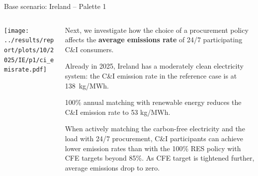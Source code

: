 \begin{frame}{Base scenario: Ireland -- Palette 1}

{\footnotesize
\vspace{0.3cm}

\begin{columns}[T]
\begin{column}{9cm}
\centering

\texttt{[image: ../results/report/plots/10/2025/IE/p1/ci\_emisrate.pdf]}

\end{column}
\begin{column}{6cm}

\vspace{0.1cm}
Next, we investigate how the choice of a procurement policy affects the {\bf average emissions 
rate} of 24/7 participating C\&I consumers.

\vspace{0.3cm}
Already in 2025, Ireland has a moderately clean electricity system: 
the C\&I emission rate in the reference case is at 138~kg/MWh.

\vspace{0.3cm}
100\% annual matching with renewable energy reduces the 
C\&I emission rate to 53 kg/MWh.

\vspace{0.3cm}
When actively matching the carbon-free electricity and the load with 
24/7 procurement, C\&I participants can achieve \alert{lower emission 
rates than with the 100\% RES policy} with CFE targets beyond 85\%. 
As CFE target is tightened further, average emissions \alert{drop to zero}.

\end{column}
\end{columns}
}
\end{frame}




